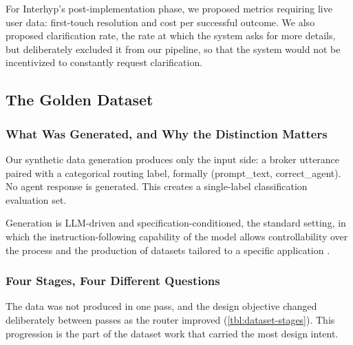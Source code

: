 For Interhyp's post-implementation phase, we proposed metrics requiring live user data: first-touch resolution and cost per successful outcome. We also proposed clarification rate, the rate at which the system asks for more details, but deliberately excluded it from our pipeline, so that the system would not be incentivized to constantly request clarification.

\subsection{The Golden Dataset}\label{sec:golden-dataset}

\subsubsection{What Was Generated, and Why the Distinction Matters}\label{sec:dataset-scope}

Our synthetic data generation produces only the input side: a broker utterance paired with a categorical routing label, formally (prompt\_text, correct\_agent). No agent response is generated. This creates a single-label classification evaluation set.

Generation is LLM-driven and specification-conditioned, the standard setting, in which the instruction-following capability of the model allows controllability over the process and the production of datasets tailored to a specific application \autocite{long2024syntheticdata}.

\subsubsection{Four Stages, Four Different Questions}\label{sec:dataset-stages}

The data was not produced in one pass, and the design objective changed deliberately between passes as the router improved (\cref{tbl:dataset-stages}). This progression is the part of the dataset work that carried the most design intent.

